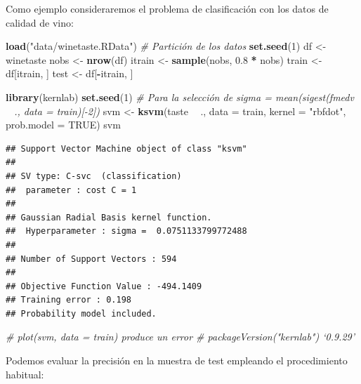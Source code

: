 \documentclass[
]{book}
\newenvironment{Shaded}{\begin{snugshade}}{\end{snugshade}}
\newcommand{\CommentTok}[1]{\textcolor[rgb]{0.56,0.35,0.01}{\textit{#1}}}
\newcommand{\DataTypeTok}[1]{\textcolor[rgb]{0.13,0.29,0.53}{#1}}
\newcommand{\DecValTok}[1]{\textcolor[rgb]{0.00,0.00,0.81}{#1}}
\newcommand{\FloatTok}[1]{\textcolor[rgb]{0.00,0.00,0.81}{#1}}
\newcommand{\KeywordTok}[1]{\textcolor[rgb]{0.13,0.29,0.53}{\textbf{#1}}}
\newcommand{\NormalTok}[1]{#1}
\newcommand{\OperatorTok}[1]{\textcolor[rgb]{0.81,0.36,0.00}{\textbf{#1}}}
\newcommand{\OtherTok}[1]{\textcolor[rgb]{0.56,0.35,0.01}{#1}}
\newcommand{\StringTok}[1]{\textcolor[rgb]{0.31,0.60,0.02}{#1}}
\theoremstyle{break}
\theoremstyle{definition}
\theoremstyle{definition}
\theoremstyle{definition}
\theoremstyle{remark}
\begin{document}
Como ejemplo consideraremos el problema de clasificación con los datos de calidad de vino:

\begin{Shaded}
\begin{Highlighting}[]
\KeywordTok{load}\NormalTok{(}\StringTok{"data/winetaste.RData"}\NormalTok{)}
\CommentTok{# Partición de los datos}
\KeywordTok{set.seed}\NormalTok{(}\DecValTok{1}\NormalTok{)}
\NormalTok{df <-}\StringTok{ }\NormalTok{winetaste}
\NormalTok{nobs <-}\StringTok{ }\KeywordTok{nrow}\NormalTok{(df)}
\NormalTok{itrain <-}\StringTok{ }\KeywordTok{sample}\NormalTok{(nobs, }\FloatTok{0.8} \OperatorTok{*}\StringTok{ }\NormalTok{nobs)}
\NormalTok{train <-}\StringTok{ }\NormalTok{df[itrain, ]}
\NormalTok{test <-}\StringTok{ }\NormalTok{df[}\OperatorTok{-}\NormalTok{itrain, ]}


\KeywordTok{library}\NormalTok{(kernlab)}
\KeywordTok{set.seed}\NormalTok{(}\DecValTok{1}\NormalTok{) }\CommentTok{# Para la selección de sigma = mean(sigest(fmedv ~ ., data = train)[-2])}
\NormalTok{svm <-}\StringTok{ }\KeywordTok{ksvm}\NormalTok{(taste }\OperatorTok{~}\StringTok{ }\NormalTok{., }\DataTypeTok{data =}\NormalTok{ train,}
            \DataTypeTok{kernel =} \StringTok{"rbfdot"}\NormalTok{, }\DataTypeTok{prob.model =} \OtherTok{TRUE}\NormalTok{)}
\NormalTok{svm}
\end{Highlighting}
\end{Shaded}

\begin{verbatim}
## Support Vector Machine object of class "ksvm" 
## 
## SV type: C-svc  (classification) 
##  parameter : cost C = 1 
## 
## Gaussian Radial Basis kernel function. 
##  Hyperparameter : sigma =  0.0751133799772488 
## 
## Number of Support Vectors : 594 
## 
## Objective Function Value : -494.1409 
## Training error : 0.198 
## Probability model included.
\end{verbatim}

\begin{Shaded}
\begin{Highlighting}[]
\CommentTok{# plot(svm, data = train) produce un error # packageVersion("kernlab") ‘0.9.29’}
\end{Highlighting}
\end{Shaded}

Podemos evaluar la precisión en la muestra de test empleando el procedimiento habitual:

\begin{Shaded}
\end{Shaded}
\end{document}
